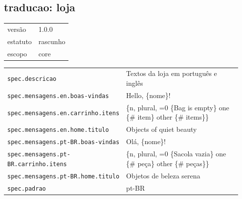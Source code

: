 \subsection*{traducao: loja}
\begin{tabular}{@{}ll@{}}
versão & 1.0.0 \\
estatuto & rascunho \\
escopo & core \\
\end{tabular}

\begin{tabular}{@{}p{0.35\linewidth}p{0.6\linewidth}@{}}
\texttt{spec.descricao} & Textos da loja em português e inglês \\
\texttt{spec.mensagens.en.boas-vindas} & Hello, \{nome\}! \\
\texttt{spec.mensagens.en.carrinho.itens} & \{n, plural, =0 \{Bag is empty\} one \{\# item\} other \{\# items\}\} \\
\texttt{spec.mensagens.en.home.titulo} & Objects of quiet beauty \\
\texttt{spec.mensagens.pt-BR.boas-vindas} & Olá, \{nome\}! \\
\texttt{spec.mensagens.pt-BR.carrinho.itens} & \{n, plural, =0 \{Sacola vazia\} one \{\# peça\} other \{\# peças\}\} \\
\texttt{spec.mensagens.pt-BR.home.titulo} & Objetos de beleza serena \\
\texttt{spec.padrao} & pt-BR \\
\end{tabular}

